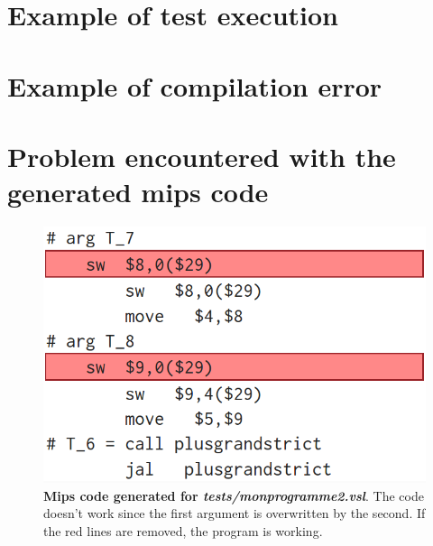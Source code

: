 \documentclass[a4paper,11pt,english]{article}
\begin{document}
\appendix
\section{Example of test execution}
\label{sec.test}
\section{Example of compilation error}
\label{sec.error}
\section{Problem encountered with the generated mips code}
\label{sec.mips}
\begin{figure}[h]
\centering
\includegraphics[scale=0.4]{diff}
\caption{
  \textbf{Mips code generated for \textit{tests/monprogramme2.vsl}}.
  The code doesn't work since the first argument is overwritten by the second.
  If the red lines are removed, the program is working.}
\label{prodcons}
\end{figure}
\end{document}
